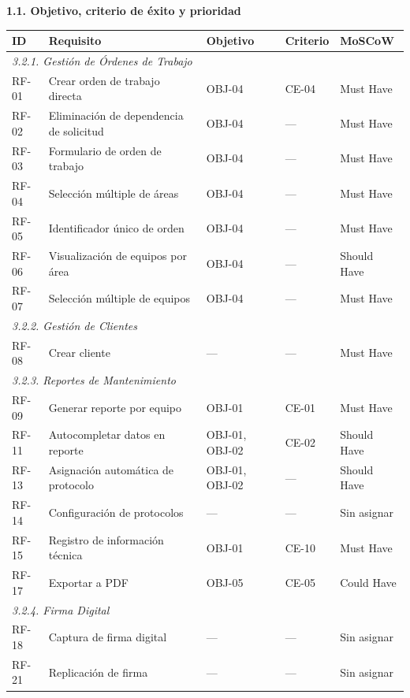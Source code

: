 \documentclass[12pt,varwidth=170mm,border=10pt]{standalone}
\newcommand{\subsectiontitle}[1]{%
  \par\vspace{1.3ex}%
  {\normalfont\large\bfseries #1\par}%
  \vspace{0.5ex}%
}
\newcommand{\hueco}{---}
\begin{document}
\subsectiontitle{1.1. Objetivo, criterio de éxito y prioridad}

\begingroup
\small
\begin{center}
\begin{tabular}{|p{1.3cm}|p{5.3cm}|p{2.5cm}|p{2.1cm}|p{2.3cm}|}
\hline
\textbf{ID} & \textbf{Requisito} & \textbf{Objetivo} & \textbf{Criterio} & \textbf{MoSCoW} \\
\hline
\multicolumn{5}{|l|}{\textit{3.2.1. Gestión de Órdenes de Trabajo}} \\
\hline
RF-01 & Crear orden de trabajo directa & OBJ-04 & CE-04 & Must Have \\
RF-02 & Eliminación de dependencia de solicitud & OBJ-04 & \hueco{} & Must Have \\
RF-03 & Formulario de orden de trabajo & OBJ-04 & \hueco{} & Must Have \\
RF-04 & Selección múltiple de áreas & OBJ-04 & \hueco{} & Must Have \\
RF-05 & Identificador único de orden & OBJ-04 & \hueco{} & Must Have \\
RF-06 & Visualización de equipos por área & OBJ-04 & \hueco{} & Should Have \\
RF-07 & Selección múltiple de equipos & OBJ-04 & \hueco{} & Must Have \\
\hline
\multicolumn{5}{|l|}{\textit{3.2.2. Gestión de Clientes}} \\
\hline
RF-08 & Crear cliente & \hueco{} & \hueco{} & Must Have \\
\hline
\multicolumn{5}{|l|}{\textit{3.2.3. Reportes de Mantenimiento}} \\
\hline
RF-09 & Generar reporte por equipo & OBJ-01 & CE-01 & Must Have \\
RF-11 & Autocompletar datos en reporte & OBJ-01, OBJ-02 & CE-02 & Should Have \\
RF-13 & Asignación automática de protocolo & OBJ-01, OBJ-02 & \hueco{} & Should Have \\
RF-14 & Configuración de protocolos & \hueco{} & \hueco{} & Sin asignar \\
RF-15 & Registro de información técnica & OBJ-01 & CE-10 & Must Have \\
RF-17 & Exportar a PDF & OBJ-05 & CE-05 & Could Have \\
\hline
\multicolumn{5}{|l|}{\textit{3.2.4. Firma Digital}} \\
\hline
RF-18 & Captura de firma digital & \hueco{} & \hueco{} & Sin asignar \\
RF-21 & Replicación de firma & \hueco{} & \hueco{} & Sin asignar \\

\end{tabular}
\end{center}
\end{document}
